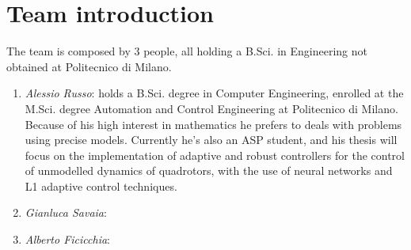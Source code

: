 \chapter{Team introduction}
The team is composed by 3 people, all holding a B.Sci. in Engineering not obtained at Politecnico di Milano. 
\begin{enumerate}
\item \emph{Alessio Russo}: holds a B.Sci. degree in Computer Engineering, enrolled at the M.Sci. degree Automation and Control Engineering at Politecnico di Milano. Because of his high interest in mathematics he prefers to deals with problems using precise models. Currently he's also an ASP student, and his thesis will focus on the implementation of adaptive and robust controllers for the control of unmodelled dynamics of quadrotors, with the use of neural networks and L1 adaptive control techniques. 
\item \emph{Gianluca Savaia}:
\item \emph{Alberto Ficicchia}:
\end{enumerate}